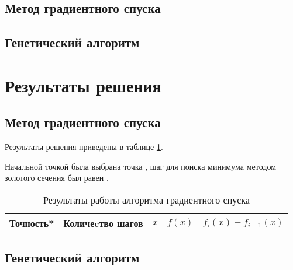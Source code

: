 \documentclass[10pt,a4paper,titlepage]{article}
\begin{document}
\subsection{Метод градиентного спуска}
\lstset{language=C++, caption=Градиентный спуск,%
label=gd-source-code, basicstyle=\footnotesize,%
numbers=left, numberstyle=\footnotesize, numbersep=5pt, frame=single, breaklines=true, breakatwhitespace=false,%
inputencoding=utf8x}


\subsection{Генетический алгоритм}
\lstset{language=C++, caption=Генетический алгоритм,%
label=gen-source-code, basicstyle=\footnotesize,%
numbers=left, numberstyle=\footnotesize, numbersep=5pt, frame=single, breaklines=true, breakatwhitespace=false,%
inputencoding=utf8x}


\section{Результаты решения}
\subsection{Метод градиентного спуска}
Результаты решения приведены в таблице \ref{gd-result-table}.

Начальной точкой была выбрана точка \!, %
шаг для поиска минимума методом золотого сечения был равен \!. %

\begin{table}[H]
\caption{Результаты работы алгоритма градиентного спуска}
\label{gd-result-table}
\begin{center}
\begin{tabular}{|c|c|c|c|c|}
\hline
Точность* & Количеcтво шагов & $x$ & $f(x)$ & $f_i(x) - f_{i - 1}(x)$ \\
\hline

\hline
\end{tabular}
\end{center}
\end{table}

\subsection{Генетический алгоритм}
\end{document}
